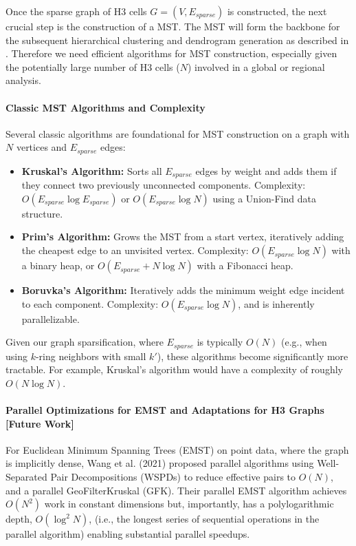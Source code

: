 Once the sparse graph of H3 cells $G=(V, E_{sparse})$ is constructed, the next crucial step is the construction of a MST. 
The MST will form the backbone for the subsequent hierarchical clustering and dendrogram generation as described in \cite{Wang_Yu_Gu_Shun_2021}. 
Therefore we need efficient algorithms for MST construction, especially given the potentially large number of H3 cells ($N$) involved in a global or regional analysis.

\paragraph{Classic MST Algorithms and Complexity}
Several classic algorithms are foundational for MST construction on a graph with $N$ vertices and $E_{sparse}$ edges:
\begin{itemize}
    \item \textbf{Kruskal's Algorithm:} Sorts all $E_{sparse}$ edges by weight and adds them if they connect two previously unconnected components. Complexity: $O(E_{sparse} \log E_{sparse})$ or $O(E_{sparse} \log N)$ using a Union-Find data structure.
    \item \textbf{Prim's Algorithm:} Grows the MST from a start vertex, iteratively adding the cheapest edge to an unvisited vertex. Complexity: $O(E_{sparse} \log N)$ with a binary heap, or $O(E_{sparse} + N \log N)$ with a Fibonacci heap.
    \item \textbf{Boruvka's Algorithm:} Iteratively adds the minimum weight edge incident to each component. Complexity: $O(E_{sparse} \log N)$, and is inherently parallelizable.
\end{itemize}
Given our graph sparsification, where $E_{sparse}$ is typically $O(N)$ (e.g., when using $k$-ring neighbors with small $k'$), these algorithms become significantly more tractable. For example, Kruskal's algorithm would have a complexity of roughly $O(N \log N)$.

\paragraph{Parallel Optimizations for EMST and Adaptations for H3 Graphs [Future Work]}
For Euclidean Minimum Spanning Trees (EMST) on point data, where the graph is implicitly dense, Wang et al. (2021) proposed parallel algorithms using Well-Separated Pair Decompositions (WSPDs) to reduce effective pairs to $O(N)$, and a parallel GeoFilterKruskal (GFK)\cite{Wang_Fast_Parallel_EMST_HDBSCAN_2021}. 
Their parallel EMST algorithm achieves $O(N^2)$ work in constant dimensions but, importantly, has a polylogarithmic depth, $O(\log^2 N)$, (i.e., the longest series of sequential operations in the parallel algorithm) enabling substantial parallel speedups. 


